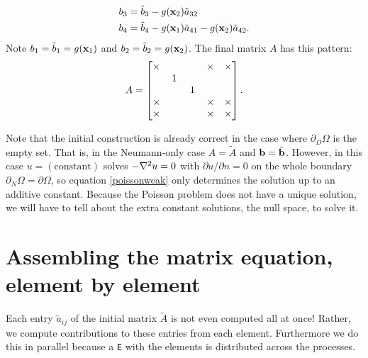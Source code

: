 \begin{example}
\begin{align*}
b_3 &= \tilde b_3 - g(\mathbf{x}_2) \tilde a_{32} \\
b_4 &= \tilde b_4 - g(\mathbf{x}_1) \tilde a_{41} - g(\mathbf{x}_2) \tilde a_{42}.
\end{align*}
Note $b_1=\tilde b_1=g(\mathbf{x}_1)$ and $b_2 = \tilde b_2 = g(\mathbf{x}_2)$.  The final matrix $A$ has this pattern:
\begin{equation*}
A = \begin{bmatrix}
\times & & & \times & \times \\
 & \,1\, & & & \\
 & & \,1\, & & \\
\times & & & \times & \times \\
\times & & & \times & \times
\end{bmatrix}.
\end{equation*}
\end{example}
\noindent\hrulefill

\bigskip

Note that the initial construction is already correct in the case where $\partial_D \Omega$ is the empty set.  That is, in the Neumann-only case $A=\tilde A$ and $\mathbf{b} = \tilde {\mathbf{b}}$.  However, in this case $u=(\text{constant})$ solves $-\nabla^2 u=0$ with $\partial u/\partial n = 0$ on the whole boundary $\partial_N \Omega = \partial \Omega$, so equation \eqref{poissonweak} only determines the solution up to an additive constant.  Because the Poisson problem does not have a unique solution, we will have to tell \PETSc about the extra constant solutions, the null space, to solve it.


\section{Assembling the matrix equation, element by element}

Each entry $\tilde a_{ij}$ of the initial matrix $\tilde A$ is not even computed all at once!  Rather, we compute contributions to these entries from each element.  Furthermore we do this in parallel because a \pVec \texttt{E} with the elements is distributed across the processes.

